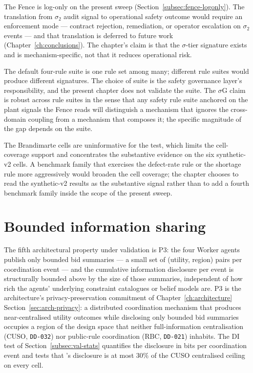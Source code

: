 The Fence is log-only on the present sweep
(Section~\ref{subsec:fence-logonly}). The translation from $\sigma_2$
audit signal to operational safety outcome would require an
enforcement mode --- contract rejection, remediation, or operator
escalation on $\sigma_2$ events --- and that translation is deferred
to future work (Chapter~\ref{ch:conclusions}). The chapter's claim
is that the $\sigma$-tier signature exists and is mechanism-specific,
not that it reduces operational risk.

The default four-rule suite is one rule set among many; different
rule suites would produce different signatures. The choice of suite
is the safety governance layer's responsibility, and the present
chapter does not validate the suite. The $\sigma$G claim is robust
across rule suites in the sense that any safety rule suite anchored
on the plant signals the Fence reads will distinguish a mechanism
that ignores the cross-domain coupling from a mechanism that
composes it; the specific magnitude of the gap depends on the suite.

The Brandimarte cells are uninformative for the test, which limits
the cell-coverage support and concentrates the substantive evidence
on the six synthetic-v2 cells. A benchmark family that exercises the
defect-rate rule or the shortage rule more aggressively would
broaden the cell coverage; the chapter chooses to read the
synthetic-v2 results as the substantive signal rather than to add a
fourth benchmark family inside the scope of the present sweep.

\section{Bounded information sharing}
\label{sec:val-disclosure}

The fifth architectural property under validation is P3: the four
Worker agents publish only bounded bid summaries --- a small set of
(utility, region) pairs per coordination event --- and the cumulative
information disclosure per event is structurally bounded above by the
size of those summaries, independent of how rich the agents'
underlying constraint catalogues or belief models are. P3 is the
architecture's privacy-preservation commitment of Chapter~\ref{ch:architecture}
Section~\ref{sec:arch-privacy}: a distributed coordination
mechanism that produces near-centralised utility outcomes while
disclosing only bounded bid summaries occupies a region of the
design space that neither full-information centralisation (CUSO,
\texttt{DD-032}) nor public-rule coordination (RBC, \texttt{DD-021})
inhabits. The DI test of Section~\ref{subsec:val-stats} quantifies
the disclosure in bits per coordination event and tests that
\NEXUS{}'s disclosure is at most $30\%$ of the CUSO centralised
ceiling on every cell.


